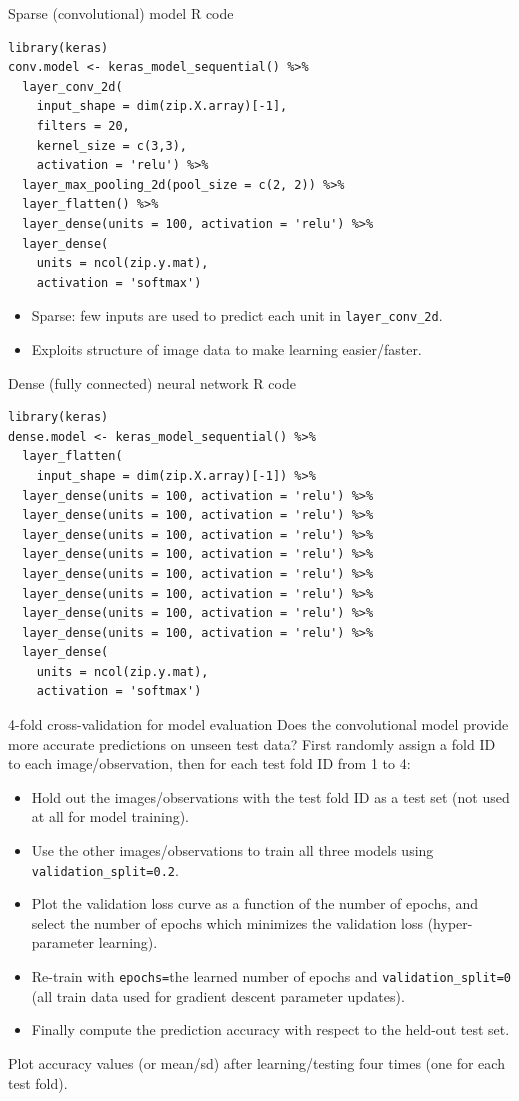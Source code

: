 \documentclass[12pt]{article}
\begin{document}
{Sparse (convolutional) model R code}
\begin{verbatim}
library(keras)
conv.model <- keras_model_sequential() %>%
  layer_conv_2d(
    input_shape = dim(zip.X.array)[-1],
    filters = 20,
    kernel_size = c(3,3),
    activation = 'relu') %>% 
  layer_max_pooling_2d(pool_size = c(2, 2)) %>%
  layer_flatten() %>%
  layer_dense(units = 100, activation = 'relu') %>% 
  layer_dense(
    units = ncol(zip.y.mat), 
    activation = 'softmax')
\end{verbatim}
  \begin{itemize}
  \item Sparse: few inputs are used to predict each unit in
    \texttt{layer\_conv\_2d}.
  \item Exploits structure of image data to make learning
    easier/faster.
  \end{itemize}

{Dense (fully connected) neural network R code}
\begin{verbatim}
library(keras)
dense.model <- keras_model_sequential() %>%
  layer_flatten(
    input_shape = dim(zip.X.array)[-1]) %>%
  layer_dense(units = 100, activation = 'relu') %>% 
  layer_dense(units = 100, activation = 'relu') %>% 
  layer_dense(units = 100, activation = 'relu') %>% 
  layer_dense(units = 100, activation = 'relu') %>%
  layer_dense(units = 100, activation = 'relu') %>%
  layer_dense(units = 100, activation = 'relu') %>% 
  layer_dense(units = 100, activation = 'relu') %>%   
  layer_dense(units = 100, activation = 'relu') %>% 
  layer_dense(
    units = ncol(zip.y.mat), 
    activation = 'softmax')
\end{verbatim}

{4-fold cross-validation for model evaluation}
  Does the convolutional model provide more accurate predictions on
  unseen test data? First randomly assign a fold ID to each image/observation,
  then for each test fold ID from 1 to 4:
  \begin{itemize}
  \item Hold out the images/observations with the test fold ID as a
    test set (not used at all for model training).
  \item Use the other images/observations to train all three models
    using \texttt{validation\_split=0.2}.
  \item Plot the validation loss curve as a function of the number of
    epochs, and select the number of epochs which minimizes the
    validation loss (hyper-parameter learning).
  \item Re-train with \texttt{epochs=}the learned number of epochs and
    \texttt{validation\_split=0} (all train data used for gradient
    descent parameter updates).
  \item Finally compute the prediction accuracy with respect to the
    held-out test set.
  \end{itemize}
Plot accuracy values (or mean/sd) after learning/testing four times
(one for each test fold).
\end{document}
